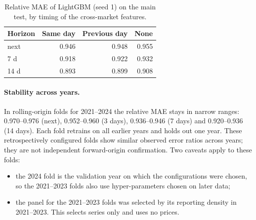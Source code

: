 \begin{table}[t]\centering\small
\caption{Relative MAE of LightGBM (seed 1) on the main test, by timing of the cross-market features.}\label{tab:timing}
\begin{tabular}{@{}lrrr@{}}\toprule
Horizon & Same day & Previous day & None\\\midrule
next & 0.946 & 0.948 & 0.955\\
7 d & 0.918 & 0.922 & 0.932\\
14 d & 0.893 & 0.899 & 0.908\\\bottomrule
\end{tabular}\end{table}

\paragraph{Stability across years.}
In rolling-origin folds for 2021--2024 the relative MAE stays in narrow ranges: 0.970--0.976 (next), 0.952--0.960 (3 days), 0.936--0.946 (7 days) and 0.920--0.936 (14 days). Each fold retrains on all earlier years and holds out one year.
These retrospectively configured folds show similar observed error ratios across years; they are not independent forward-origin confirmation.
Two caveats apply to these folds:
\begin{itemize}
  \item the 2024 fold is the validation year on which the configurations were chosen, so the 2021--2023 folds also use hyper-parameters chosen on later data;
  \item the panel for the 2021--2023 folds was selected by its reporting density in 2021--2023. This selects series only and uses no prices.
\end{itemize}
